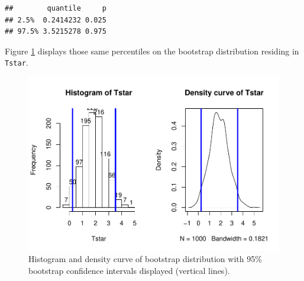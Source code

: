 \documentclass[]{book}
\newenvironment{Shaded}{\begin{snugshade}}{\end{snugshade}}
\newcommand{\KeywordTok}[1]{\textcolor[rgb]{0.13,0.29,0.53}{\textbf{#1}}}
\newcommand{\DataTypeTok}[1]{\textcolor[rgb]{0.13,0.29,0.53}{#1}}
\newcommand{\DecValTok}[1]{\textcolor[rgb]{0.00,0.00,0.81}{#1}}
\newcommand{\StringTok}[1]{\textcolor[rgb]{0.31,0.60,0.02}{#1}}
\newcommand{\OperatorTok}[1]{\textcolor[rgb]{0.81,0.36,0.00}{\textbf{#1}}}
\newcommand{\NormalTok}[1]{#1}
\begin{document}
\begin{verbatim}
##        quantile     p
## 2.5%  0.2414232 0.025
## 97.5% 3.5215278 0.975
\end{verbatim}

Figure \ref{fig:Figure2-19} displays those same percentiles on the
bootstrap distribution residing in \texttt{Tstar}.




\begin{Shaded}
\end{Shaded}

\begin{figure}
\centering
\includegraphics{GreenwoodBanner_files/figure-latex/Figure2-19-1.pdf}
\caption{\label{fig:Figure2-19}Histogram and density curve of bootstrap distribution with
95\% bootstrap confidence intervals displayed (vertical lines).}
\end{figure}
\end{document}
